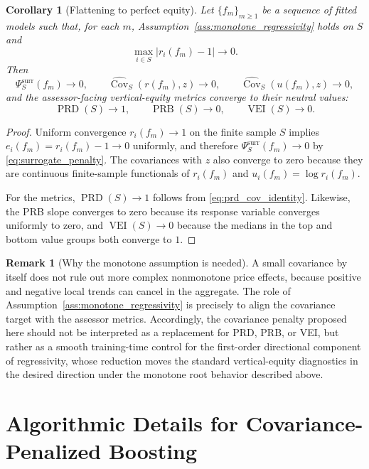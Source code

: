 \documentclass[12pt, draft]{article}
\newtheorem{corollary}{Corollary}
\theoremstyle{plain}
\theoremstyle{definition}
\newtheorem{remark}{Remark}
\newcommand{\1}{\mathbf{1}}
\begin{document}
{\begin{corollary}[Flattening to perfect equity]
\label{cor:neutralization}
Let $\{f_m\}_{m\ge 1}$ be a sequence of fitted models such that, for each $m$, Assumption~\ref{ass:monotone_regressivity} holds on $S$ and
\[
\max_{i\in S}|r_i(f_m)-1|\to 0.
\]
Then
\[
\Psi_S^{\mathrm{surr}}(f_m)\to 0,
\qquad
\widehat{\operatorname{Cov}}_S(r(f_m),z)\to 0,
\qquad
\widehat{\operatorname{Cov}}_S(u(f_m),z)\to 0,
\]
and the assessor-facing vertical-equity metrics converge to their neutral values:
\[
\operatorname{PRD}(S)\to 1,
\qquad
\operatorname{PRB}(S)\to 0,
\qquad
\operatorname{VEI}(S)\to 0.
\]
\end{corollary}

\begin{proof}
Uniform convergence $r_i(f_m)\to 1$ on the finite sample $S$ implies $e_i(f_m)=r_i(f_m)-1\to 0$ uniformly, and therefore $\Psi_S^{\mathrm{surr}}(f_m)\to 0$ by \eqref{eq:surrogate_penalty}. The covariances with $z$ also converge to zero because they are continuous finite-sample functionals of $r_i(f_m)$ and $u_i(f_m)=\log r_i(f_m)$.

For the metrics, $\operatorname{PRD}(S)\to 1$ follows from \eqref{eq:prd_cov_identity}. Likewise, the PRB slope converges to zero because its response variable converges uniformly to zero, and $\operatorname{VEI}(S)\to 0$ because the medians in the top and bottom value groups both converge to $1$.
\end{proof}

\begin{remark}[Why the monotone assumption is needed]
\label{rem:cov_not_sufficient}
A small covariance by itself does not rule out more complex nonmonotone price effects, because positive and negative local trends can cancel in the aggregate. The role of Assumption~\ref{ass:monotone_regressivity} is precisely to align the covariance target with the assessor metrics. Accordingly, the covariance penalty proposed here should not be interpreted as a replacement for PRD, PRB, or VEI, but rather as a smooth training-time control for the first-order directional component of regressivity, whose reduction moves the standard vertical-equity diagnostics in the desired direction under the monotone root behavior described above.
\end{remark}

\section{Algorithmic Details for Covariance-Penalized Boosting}
\label{app:boosting_algorithms}

}
\end{document}
